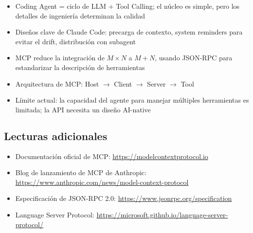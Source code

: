 \begin{itemize}
    \item Coding Agent = ciclo de LLM + Tool Calling; el núcleo es simple, pero los detalles de ingeniería determinan la calidad
    \item Diseños clave de Claude Code: precarga de contexto, system reminders para evitar el drift, distribución con subagent
    \item MCP reduce la integración de $M \times N$ a $M + N$, usando JSON-RPC para estandarizar la descripción de herramientas
    \item Arquitectura de MCP: Host $\rightarrow$ Client $\rightarrow$ Server $\rightarrow$ Tool
    \item Límite actual: la capacidad del agente para manejar múltiples herramientas es limitada; la API necesita un diseño AI-native
\end{itemize}

\subsection{Lecturas adicionales}

\begin{itemize}
    \item Documentación oficial de MCP: \url{https://modelcontextprotocol.io}
    \item Blog de lanzamiento de MCP de Anthropic: \url{https://www.anthropic.com/news/model-context-protocol}
    \item Especificación de JSON-RPC 2.0: \url{https://www.jsonrpc.org/specification}
    \item Language Server Protocol: \url{https://microsoft.github.io/language-server-protocol/}
\end{itemize}



